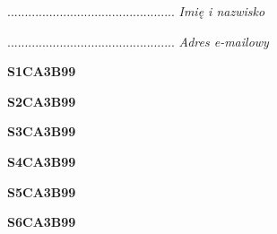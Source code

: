 \begin{turn}{90}\begin{minipage}{\linewidth} \vspace{20mm} ................................................  \textit{Imię i nazwisko}\end{minipage}\end{turn}

\begin{turn}{90}\begin{minipage}{\linewidth} \vspace{20mm} ................................................  \textit{Adres e-mailowy}\end{minipage}\end{turn}

\begin{turn}{90}\huge \begin{minipage}{\linewidth} \vspace{10mm}\textbf{S1CA3B99}\end{minipage}\end{turn}

\begin{turn}{90}\huge \begin{minipage}{\linewidth} \vspace{10mm}\textbf{S2CA3B99}\end{minipage}\end{turn}

\begin{turn}{90}\huge \begin{minipage}{\linewidth} \vspace{10mm}\textbf{S3CA3B99}\end{minipage}\end{turn}

\begin{turn}{90}\huge \begin{minipage}{\linewidth} \vspace{10mm}\textbf{S4CA3B99}\end{minipage}\end{turn}

\begin{turn}{90}\huge \begin{minipage}{\linewidth} \vspace{10mm}\textbf{S5CA3B99}\end{minipage}\end{turn}

\begin{turn}{90}\huge \begin{minipage}{\linewidth} \vspace{10mm}\textbf{S6CA3B99}\end{minipage}\end{turn}